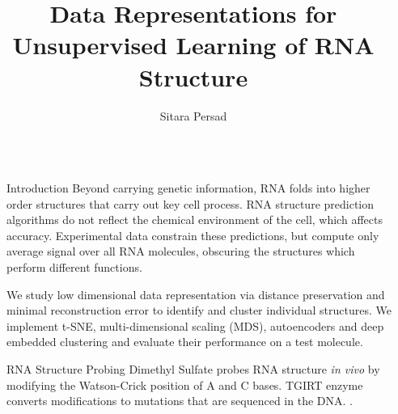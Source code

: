 \documentclass[final]{beamer}
\title{Data Representations for Unsupervised Learning of RNA Structure} %
\author{Sitara Persad} %
\institute{MIT 6.860/9.520 Project} %
\newlength{\sepwid}
\newlength{\onecolwid}
\begin{document}

\setlength{\belowcaptionskip}{2ex} %
\setlength\belowdisplayshortskip{2ex} %

\begin{frame}[t] %

\begin{columns}[t] %

\begin{column}{\sepwid}\end{column} %

\begin{column}{\onecolwid} %


\begin{alertblock}{Introduction}
Beyond carrying genetic information, RNA folds into higher order structures that carry out key cell process. RNA structure prediction algorithms do not reflect the chemical environment of the cell, which affects accuracy. Experimental data constrain these predictions, but compute only average signal over all RNA molecules, obscuring the structures which perform different functions.

We  study low dimensional data representation via distance preservation and minimal reconstruction error to identify and cluster individual structures. We implement t-SNE, multi-dimensional scaling (MDS), autoencoders and deep embedded clustering and evaluate their performance on a test molecule. 
\end{alertblock}


\begin{block}{RNA Structure Probing}
Dimethyl Sulfate probes RNA structure \textit{in vivo} by modifying the Watson-Crick position of A and C bases. 
TGIRT enzyme converts modifications to mutations that are sequenced in the DNA. \cite{zubradt2017dms}.


\end{block}
\end{column}
\end{columns}
\end{frame}
\end{document}
